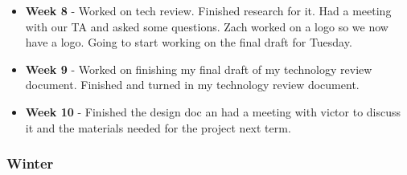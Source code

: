 \documentclass[onecolumn, draftclsnofoot,10pt, compsoc]{IEEEtran}
\begin{document}
\begin{itemize}
					\item \textbf{Week 8} - Worked on tech review. Finished research  for it. Had a meeting with our TA and asked some questions. Zach worked on a logo so we now have a logo.  Going to start working on the final draft for Tuesday.  
					\item \textbf{Week 9} - Worked on finishing my final draft of my technology review document. Finished and turned in my technology review document.  
					\item \textbf{Week 10} - Finished the design doc an had a meeting with victor to discuss it and the materials needed for the project next term. 
				\end{itemize}
			\subsubsection{Winter}
\end{document}
